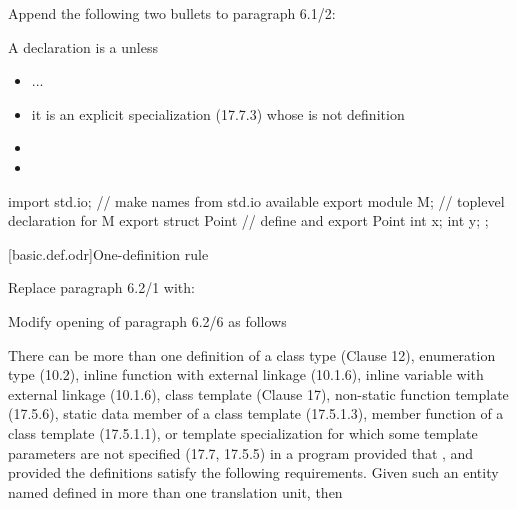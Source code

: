\noindent
Append the following two bullets to paragraph 6.1/2:
\begin{std.txt}
  \resetalinea[1]
  \alinea
  A declaration is a  unless
  \begin{itemize}
    \item ...
    \item it is an explicit specialization (17.7.3) whose 
    is not definition\added{,}
    \color{addclr}
    \item {}
    \item {} 
  \end{itemize}
  \color{addclr}
\enterexample
\begin{codeblock}
    import std.io;                  // make names from std.io available
    export module M;                // toplevel declaration for M
    export struct Point {           // define and export Point
      int x;
      int y;
    };
\end{codeblock}
\exitexample
\end{std.txt}


[basic.def.odr]{One-definition rule}

Replace paragraph 6.2/1 with:
\begin{std.txt}\color{addclr}
  \resetalinea[0]
  \alinea
\end{std.txt}

Modify opening of paragraph 6.2/6 as follows
\begin{std.txt}
  \resetalinea[5]
  \alinea
  There can be more than one definition of a class type (Clause 12), 
  enumeration type (10.2), inline function with external  
  linkage (10.1.6), 
  inline variable with external  linkage (10.1.6), 
  class template (Clause 17), 
  non-static function template (17.5.6), static data member of a class 
  template (17.5.1.3), member function of a class template (17.5.1.1), or 
  template specialization for which some template parameters are not 
  specified (17.7, 17.5.5) in a program provided that 
  , 
  and provided the definitions satisfy the 
  following requirements. 
  Given such an entity named  defined in more than one 
  translation unit, then
\end{std.txt}



